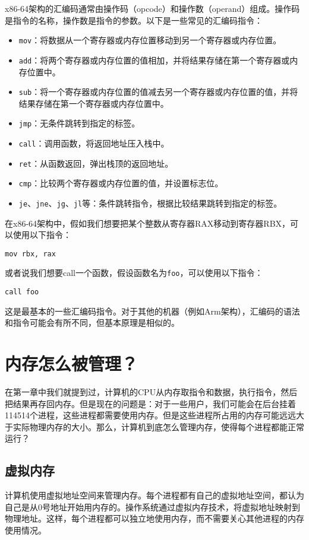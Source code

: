 \documentclass[../main.tex]{subfiles}
\begin{document}
x86-64架构的汇编码通常由操作码（opcode）和操作数（operand）组成。操作码是指令的名称，操作数是指令的参数。以下是一些常见的汇编码指令：
\begin{itemize}
  \item \texttt{mov}：将数据从一个寄存器或内存位置移动到另一个寄存器或内存位置。
  \item \texttt{add}：将两个寄存器或内存位置的值相加，并将结果存储在第一个寄存器或内存位置中。
  \item \texttt{sub}：将一个寄存器或内存位置的值减去另一个寄存器或内存位置的值，并将结果存储在第一个寄存器或内存位置中。
  \item \texttt{jmp}：无条件跳转到指定的标签。
  \item \texttt{call}：调用函数，将返回地址压入栈中。
  \item \texttt{ret}：从函数返回，弹出栈顶的返回地址。
  \item \texttt{cmp}：比较两个寄存器或内存位置的值，并设置标志位。
  \item \texttt{je}、\texttt{jne}、\texttt{jg}、\texttt{jl}等：条件跳转指令，根据比较结果跳转到指定的标签。
\end{itemize}

在x86-64架构中，假如我们想要把某个整数从寄存器RAX移动到寄存器RBX，可以使用以下指令：
\begin{lstlisting}
mov rbx, rax
\end{lstlisting}
或者说我们想要call一个函数，假设函数名为\texttt{foo}，可以使用以下指令：
\begin{lstlisting}
call foo
\end{lstlisting}
这是最基本的一些汇编码指令。对于其他的机器（例如Arm架构），汇编码的语法和指令可能会有所不同，但基本原理是相似的。

\section{内存怎么被管理？}

在第一章中我们就提到过，计算机的CPU从内存取指令和数据，执行指令，然后把结果再存回内存。但是现在的问题是：对于一些用户，我们可能会在后台挂着114514个进程，这些进程都需要使用内存。但是这些进程所占用的内存可能远远大于实际物理内存的大小。那么，计算机到底怎么管理内存，使得每个进程都能正常运行？

\subsection{虚拟内存}

计算机使用虚拟地址空间来管理内存。每个进程都有自己的虚拟地址空间，都认为自己是从0号地址开始用内存的。操作系统通过虚拟内存技术，将虚拟地址映射到物理地址。这样，每个进程都可以独立地使用内存，而不需要关心其他进程的内存使用情况。
\end{document}
